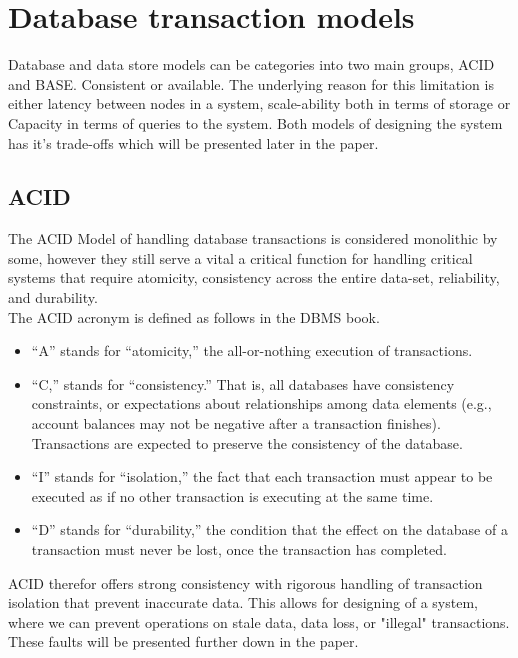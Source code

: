 \documentclass[a4paper,10pt,titlepage]{report}
\begin{document}
\chapter{Database transaction models}

Database and data store models can be categories into two main groups, ACID and BASE. Consistent or available. The underlying reason for this limitation is either latency between nodes in a system, scale-ability both in terms of storage or Capacity in terms of queries to the system. Both models of designing the system has it's trade-offs which will be presented later in the paper.
\section{ACID}

The ACID Model of handling database transactions is considered monolithic by some, however they still serve a vital a critical function for handling critical systems that require atomicity, consistency across the entire data-set, reliability, and durability.\\
\vspace{5mm}
The ACID acronym is defined as follows in the DBMS book\cite{DBMSbook}.

\begin{itemize}
    \item “A” stands for “atomicity,” the all-or-nothing execution of transactions.
    \item “C,” stands for “consistency.” That is, all databases
have consistency constraints, or expectations about relationships among
data elements (e.g., account balances may not be negative after a transaction finishes). Transactions are expected to preserve the consistency of
the database.
\item “I” stands for “isolation,” the fact that each transaction must appear
to be executed as if no other transaction is executing at the same
time.
\item “D” stands for “durability,” the condition that the effect on the
database of a transaction must never be lost, once the transaction
has completed.
\end{itemize}

ACID therefor offers strong consistency with rigorous handling of transaction isolation that prevent inaccurate data. This allows for designing of a system, where we can prevent operations on stale data, data loss, or "illegal" transactions. These faults will be presented further down in the paper.
\end{document}
